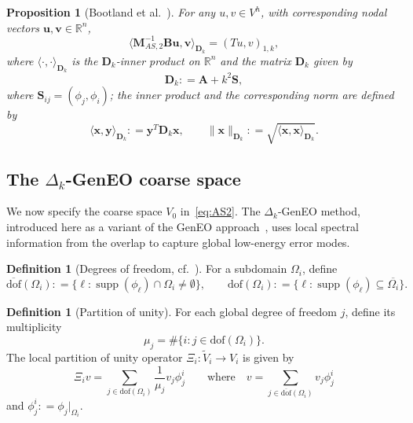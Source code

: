 \documentclass[preprint,3p,times]{elsarticle}
\newcommand{\assign}{\mathrel{\mathop:}=}
\newtheorem{proposition}[theorem]{Proposition}
\theoremstyle{definition}
\newtheorem{definition}[theorem]{Definition}
\numberwithin{equation}{section}
\begin{document}
\begin{proposition}[Bootland et al.~\cite{Bootland:2022:OSM}]\label{prop:proj}
For any $u,v \in V^h$, with corresponding nodal vectors $\mathbf{u},\mathbf{v} \in \mathbb{R}^n$, 
\begin{equation} \label{eq: 2_27}
	\langle \mathbf{M}_{AS,2}^{-1} \mathbf{B} \mathbf{u}, \mathbf{v} \rangle_{\mathbf{D}_k} = (T u, v)_{1, k},
\end{equation}
where $\langle \cdot , \cdot \rangle_{\mathbf{D}_k}$ is the $\mathbf{D}_k$-inner product on $\mathbb{R}^n$ and the matrix $\mathbf{D}_k$ given by
\begin{equation}\label{def:Dk}
    \mathbf{D}_k \assign \mathbf{A} + k^2  \mathbf{S},
\end{equation}
where $\mathbf{S}_{ij}=(\phi_j,\phi_i)$;
the inner product and the corresponding norm are defined by
\begin{equation}\label{def:A_norm}
	\langle \mathbf{x},\mathbf{y}\rangle_{\mathbf{D}_k} \assign \mathbf{y}^{\!T}\mathbf{D}_k\mathbf{x}, 
	\qquad 
	\|\mathbf{x}\|_{\mathbf{D}_k} \assign \sqrt{\langle \mathbf{x},\mathbf{x}\rangle_{\mathbf{D}_k}}.
\end{equation}
\end{proposition}

\subsection{The {$\Delta_k$}-GenEO coarse space}

We now specify the coarse space $V_0$ in~\eqref{eq:AS2}. 
The $\Delta_k$-GenEO method, introduced here as a variant of the GenEO approach~\cite{Spillane:2014:ARC}, 
uses local spectral information from the overlap to capture global low-energy error modes.

\begin{definition}[Degrees of freedom, cf.\ \cite{Spillane:2014:ARC}]\label{def:dofs}
For a subdomain $\Omega_i$, define
\[
	\overline{\mathrm{dof}}(\Omega_i) \assign \{\ell: \operatorname{supp}(\phi_\ell)\cap \Omega_i \ne \emptyset\},
	\qquad
	\mathrm{dof}(\Omega_i) \assign \{\ell: \operatorname{supp}(\phi_\ell)\subseteq \overline{\Omega_i}\}.
\]
\end{definition}

\begin{definition}[Partition of unity]\label{def:partition}
For each global degree of freedom $j$, define its multiplicity
\[
	\mu_j = \#\{ i: j\in \mathrm{dof}(\Omega_i)\}.
\]
The local partition of unity operator $\Xi_i:\widetilde{V}_i\to V_i$ is given by
\[
	\Xi_i v = \sum_{j\in \mathrm{dof}(\Omega_i)} \frac{1}{\mu_j} v_j \phi_j^i 
	\qquad\text{where} \quad
	v = \sum_{j\in \overline{\mathrm{dof}}(\Omega_i)} v_j \phi_j^i
\]
{and $\phi_j^i\assign\phi_j|_{\Omega_i}$}.
\end{definition}
\end{document}
